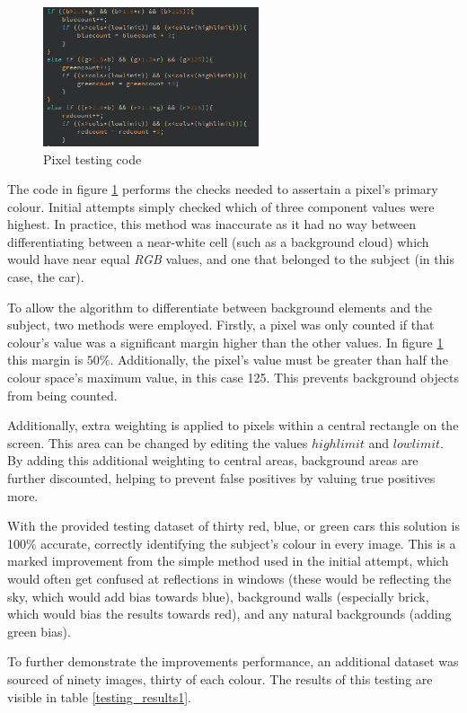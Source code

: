 \documentclass[conference]{IEEEtran}
\begin{document}
\begin{figure}[H]
\centering
\includegraphics[width=2.5in]{t1}
\caption{Pixel testing code}
\label{fig_t1code}
\end{figure}

The code in figure \ref{fig_t1code} performs the checks needed to assertain a pixel's primary colour. Initial attempts simply checked which of three component values were highest. In practice, this method was inaccurate as it had no way between differentiating between a near-white cell (such as a background cloud) which would have near equal \textit{RGB} values, and one that belonged to the subject (in this case, the car).

To allow the algorithm to differentiate between background elements and the subject, two methods were employed. Firstly, a pixel was only counted if that colour's value was a significant margin higher than the other values. In figure \ref{fig_t1code} this margin is $50\%$. Additionally, the pixel's value must be greater than half the colour space's maximum value, in this case 125. This prevents background objects from being counted.


Additionally, extra weighting is applied to pixels within a central rectangle on the screen. This area can be changed by editing the values $highlimit$ and $lowlimit$. By adding this additional weighting to central areas, background areas are further discounted, helping to prevent false positives by valuing true positives more.

With the provided testing dataset of thirty red, blue, or green cars this solution is 100$\%$ accurate, correctly identifying the subject's colour in every image. This is a marked improvement from the simple method used in the initial attempt, which would often get confused at reflections in windows (these would be reflecting the sky, which would add bias towards blue), background walls (especially brick, which would bias the results towards red), and any natural backgrounds (adding green bias).

To further demonstrate the improvements performance, an additional dataset was sourced of ninety images, thirty of each colour. The results of this testing are visible in table \ref{testing_results1}.
\end{document}
